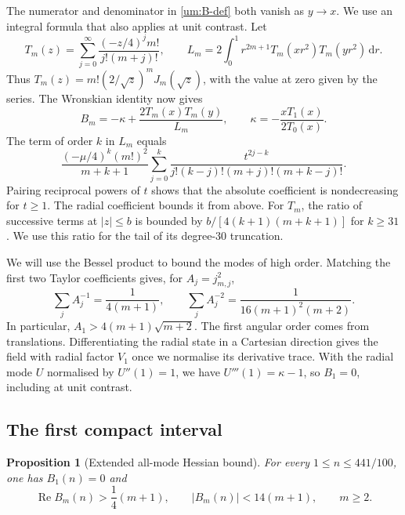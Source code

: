 \documentclass[a4paper,11pt]{amsart}
\numberwithin{equation}{section}
\theoremstyle{plain}
\newtheorem{proposition}[theorem]{Proposition}
\theoremstyle{definition}
\begin{document}
The numerator and denominator in \eqref{um:B-def} both vanish
as \(y\to x\). We use an integral formula that also applies at
unit contrast. Let
\[
 T_m(z)=\sum_{j=0}^\infty\frac{(-z/4)^j m!}{j!(m+j)!},
 \qquad
 L_m=2\int_0^1r^{2m+1}T_m(xr^2)T_m(yr^2)\,\mathrm dr .
\]
Thus \(T_m(z)=m!(2/\sqrt z)^m J_m(\sqrt z)\), with the value at
zero given by the series. The Wronskian identity now gives
\begin{equation}\label{um:B-integral}
 B_m=-\kappa+\frac{2T_m(x)T_m(y)}{L_m},
 \qquad
 \kappa=-\frac{x T_1(x)}{2T_0(x)}.
\end{equation}
The term of order \(k\) in \(L_m\) equals
\[
 \frac{(-\mu/4)^k(m!)^2}{m+k+1}
   \sum_{j=0}^k\frac{t^{2j-k}}
        {j!(k-j)!(m+j)!(m+k-j)!}.
\]
Pairing reciprocal powers of \(t\) shows that the absolute
coefficient is nondecreasing for \(t\ge1\). The radial coefficient
bounds it from above. For \(T_m\), the ratio of successive terms
at \(|z|\le b\) is bounded by \(b/[4(k+1)(m+k+1)]\) for \(k\ge31\).
We use this ratio for the tail of its degree-\(30\) truncation.

We will use the Bessel product to bound the modes of high order.
Matching the first two Taylor coefficients gives, for \(A_j=j_{m,j}^2\),
\begin{equation}\label{uh:rayleigh}
 \sum_j A_j^{-1}=\frac{1}{4(m+1)},\qquad
 \sum_j A_j^{-2}=\frac{1}{16(m+1)^2(m+2)}.
\end{equation}
In particular, \(A_1>4(m+1)\sqrt{m+2}\).
The first angular order comes from translations. Differentiating
the radial state in a Cartesian direction gives the field with
radial factor \(V_1\) once we normalise its derivative trace. With
the radial mode \(U\) normalised by \(U''(1)=1\), we have
\(U'''(1)=\kappa-1\), so \(B_1=0\), including at unit contrast.

\subsection{The first compact interval}
\begin{proposition}[Extended all-mode Hessian bound]
\label{ux:hessian}
For every \(1\le n\le441/100\), one has \(B_1(n)=0\) and
\[
 \operatorname{Re}B_m(n)>\frac14(m+1),\qquad
 |B_m(n)|<14(m+1),\qquad m\ge2.
\]
\end{proposition}
\end{document}
